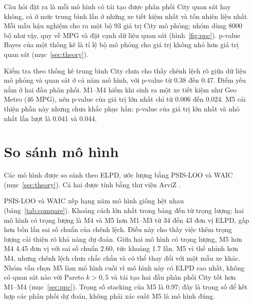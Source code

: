 \documentclass[12pt,a4paper]{report}
\begin{document}
Câu hỏi đặt ra là mỗi mô hình có tái tạo được phân phối City quan sát hay
không, cả ở mức trung bình lẫn ở những xe tiết kiệm nhất và tốn nhiên liệu nhất.
Mỗi mẫu hậu nghiệm cho ra một bộ 93 giá trị City mô phỏng; nhóm dùng
\num{8000} bộ như vậy, quy về MPG và đặt cạnh dữ liệu quan sát
(hình~\ref{fig:ppc}). p-value Bayes của một thống kê là tỉ lệ bộ mô phỏng cho
giá trị không nhỏ hơn giá trị quan sát (mục~\ref{sec:theory}).

Kiểm tra theo thống kê trung bình City chưa cho thấy chênh lệch rõ giữa dữ
liệu mô phỏng và quan sát ở cả năm mô hình, với p-value từ
\num{0.38} đến \num{0.47}. Điểm yếu nằm ở hai đầu phân phối. M1--M4 hiếm khi
sinh ra một xe tiết kiệm như Geo Metro (46 MPG), nên p-value của giá trị lớn
nhất chỉ từ \num{0.006} đến \num{0.024}. M5 cải thiện phần này nhưng chưa khắc
phục hẳn: p-value của giá trị lớn nhất và nhỏ nhất lần lượt là \num{0.041} và
\num{0.044}.


\section{So sánh mô hình}
\label{sec:compare}

Các mô hình được so sánh theo ELPD, ước lượng bằng PSIS-LOO và WAIC
(mục~\ref{sec:theory}). Cả hai được tính bằng thư viện ArviZ
\cite{kumar2019arviz}.

PSIS-LOO và WAIC xếp hạng năm mô hình giống hệt nhau (bảng~\ref{tab:compare}).
Khoảng cách lớn nhất trong bảng đến từ trọng lượng: hai mô hình có trọng lượng là M4
và M5 hơn M1--M3 từ 34 đến 43 đơn vị ELPD, gấp hơn bốn lần sai số chuẩn của
chênh lệch. Điều này cho thấy việc thêm trọng lượng cải thiện rõ khả năng dự
đoán. Giữa hai mô hình có trọng lượng, M5 hơn M4 \num{4.45} đơn vị với sai số
chuẩn \num{2.60}, tức khoảng \num{1.7} lần. M5 vì thế nhỉnh hơn M4, nhưng chênh
lệch chưa chắc chắn và có thể thay đổi với một mẫu xe khác. Nhóm vẫn chọn M5
làm mô hình cuối vì mô hình này có ELPD cao nhất, không có quan sát nào với
Pareto $k > 0{,}5$ và tái tạo hai đầu phân phối City tốt hơn M1--M4
(mục~\ref{sec:ppc}). Trọng số stacking của M5 là \num{0.97}; đây là trọng số để
kết hợp các phân phối dự đoán, không phải xác suất M5 là mô hình đúng.
\end{document}
